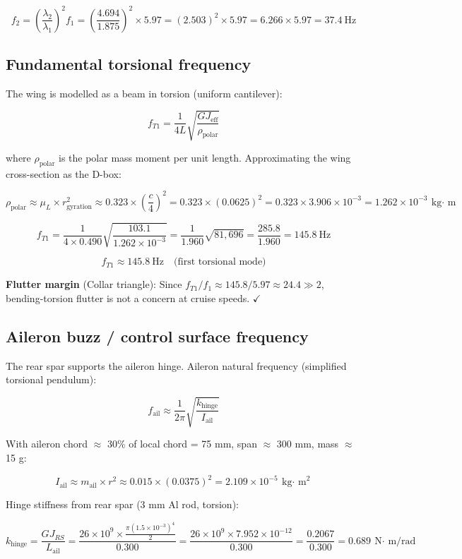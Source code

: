 \documentclass[10pt,a4paper]{article}
\begin{document}
\[
f_2 = \left(\frac{\lambda_2}{\lambda_1}\right)^2 f_1 = \left(\frac{4.694}{1.875}\right)^2 \times 5.97 = (2.503)^2 \times 5.97 = 6.266 \times 5.97 = 37.4\ \text{Hz}
\]


\subsection{Fundamental torsional frequency}


The wing is modelled as a beam in torsion (uniform cantilever):

\[
f_{T1} = \frac{1}{4L} \sqrt{\frac{GJ_{\text{eff}}}{\rho_{\text{polar}}}}
\]

where $\rho_{\text{polar}}$ is the polar mass moment per unit length. Approximating the wing cross-section as the D-box:

\[
\rho_{\text{polar}} \approx \mu_L \times r_{\text{gyration}}^2 \approx 0.323 \times \left(\frac{c}{4}\right)^2 = 0.323 \times (0.0625)^2 = 0.323 \times 3.906 \times 10^{-3} = 1.262 \times 10^{-3}\ \text{kg$\cdot$ m}
\]

\[
f_{T1} = \frac{1}{4 \times 0.490} \sqrt{\frac{103.1}{1.262 \times 10^{-3}}} = \frac{1}{1.960} \sqrt{81,696} = \frac{285.8}{1.960} = 145.8\ \text{Hz}
\]

\[
\boxed{f_{T1} \approx 145.8\ \text{Hz} \quad \text{(first torsional mode)}}
\]

\textbf{Flutter margin} (Collar triangle): Since $f_{T1}/f_1 \approx 145.8/5.97 \approx 24.4 \gg 2$, bending-torsion flutter is not a concern at cruise speeds. $\checkmark $


\subsection{Aileron buzz / control surface frequency}


The rear spar supports the aileron hinge. Aileron natural frequency (simplified torsional pendulum):

\[
f_{\text{ail}} \approx \frac{1}{2\pi}\sqrt{\frac{k_{\text{hinge}}}{I_{\text{ail}}}}
\]

With aileron chord ${\approx}$ 30\% of local chord = 75 mm, span ${\approx}$ 300 mm, mass ${\approx}$ 15 g:

\[
I_{\text{ail}} \approx m_{\text{ail}} \times r^2 \approx 0.015 \times (0.0375)^2 = 2.109 \times 10^{-5}\ \text{kg$\cdot$ m}^2
\]

Hinge stiffness from rear spar (3 mm Al rod, torsion):

\[
k_{\text{hinge}} = \frac{GJ_{RS}}{L_{\text{ail}}} = \frac{26 \times 10^9 \times \frac{\pi (1.5 \times 10^{-3})^4}{2}}{0.300} = \frac{26 \times 10^9 \times 7.952 \times 10^{-12}}{0.300} = \frac{0.2067}{0.300} = 0.689\ \text{N$\cdot$ m/rad}
\]
\end{document}
